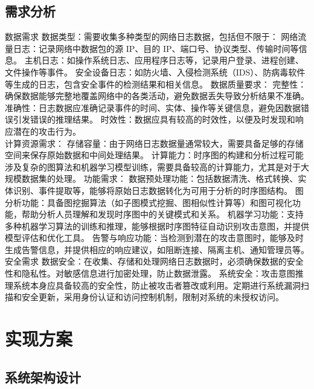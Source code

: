 \documentclass{article} %
\begin{document}
	\subsection{需求分析}
	
	数据需求
	数据类型：需要收集多种类型的网络日志数据，包括但不限于：
	网络流量日志：记录网络中数据包的源 IP、目的 IP、端口号、协议类型、传输时间等信息。
	主机日志：如操作系统日志、应用程序日志等，记录用户登录、进程创建、文件操作等事件。
	安全设备日志：如防火墙、入侵检测系统（IDS）、防病毒软件等生成的日志，包含安全事件的检测结果和相关信息。
	数据质量要求：
	完整性：确保数据能够完整地覆盖网络中的各类活动，避免数据丢失导致分析结果不准确。
	准确性：日志数据应准确记录事件的时间、实体、操作等关键信息，避免因数据错误引发错误的推理结果。
	时效性：数据应具有较高的时效性，以便及时发现和响应潜在的攻击行为。\\
	计算资源需求：
	存储容量：由于网络日志数据量通常较大，需要具备足够的存储空间来保存原始数据和中间处理结果。
	计算能力：时序图的构建和分析过程可能涉及复杂的图算法和机器学习模型训练，需要具备较高的计算能力，尤其是对于大规模数据集的处理。
	功能需求：
	数据预处理功能：包括数据清洗、格式转换、实体识别、事件提取等，能够将原始日志数据转化为可用于分析的时序图结构。
	图分析功能：具备图挖掘算法（如子图模式挖掘、图相似性计算等）和图可视化功能，帮助分析人员理解和发现时序图中的关键模式和关系。
	机器学习功能：支持多种机器学习算法的训练和推理，能够根据时序图特征自动识别攻击意图，并提供模型评估和优化工具。
	告警与响应功能：当检测到潜在的攻击意图时，能够及时生成告警信息，并提供相应的响应建议，如阻断连接、隔离主机、通知管理员等。\\
	安全需求
	数据安全：在收集、存储和处理网络日志数据时，必须确保数据的安全性和隐私性。对敏感信息进行加密处理，防止数据泄露。
	系统安全：攻击意图推理系统本身应具备较高的安全性，防止被攻击者篡改或利用。定期进行系统漏洞扫描和安全更新，采用身份认证和访问控制机制，限制对系统的未授权访问。
	
	\section{实现方案}
	
	\subsection{系统架构设计}
	
\end{document}

